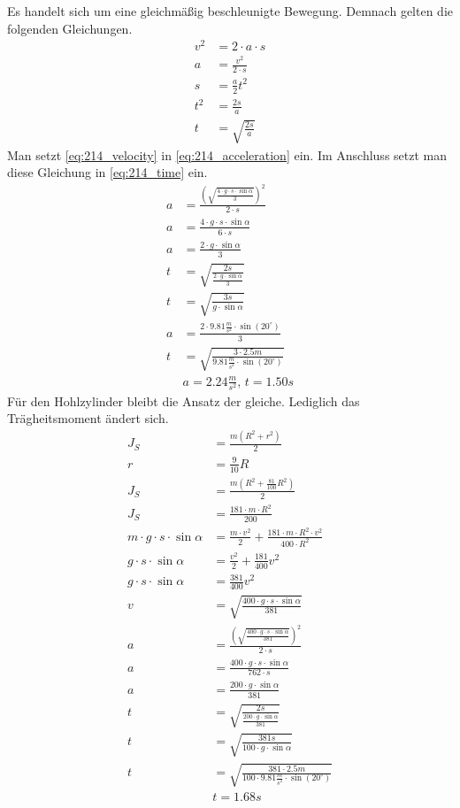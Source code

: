 \documentclass{article}
\begin{document}
	Es handelt sich um eine gleichmäßig beschleunigte Bewegung. Demnach gelten die folgenden Gleichungen.
	\begin{align}
		v^2&=2\cdot a\cdot s	\nonumber\\
		a&=\frac{v^2}{2\cdot s}	\label{eq:214_acceleration}\\
		s&=\frac{a}{2}t^2		\nonumber\\
		t^2&=\frac{2s}{a}		\nonumber\\
		t&=\sqrt{\frac{2s}{a}}	\label{eq:214_time}
	\end{align}
	Man setzt \eqref{eq:214_velocity} in \eqref{eq:214_acceleration} ein. Im Anschluss setzt man diese Gleichung in \eqref{eq:214_time} ein.
	\begin{align*}
		a&=\frac{\left(\sqrt{\frac{4\cdot g\cdot s\cdot\sin\alpha}{3}}\right)^2}{2\cdot s}\\
		a&=\frac{4\cdot g\cdot s\cdot\sin\alpha}{6\cdot s}\\
		a&=\frac{2\cdot g\cdot\sin\alpha}{3}\\
		t&=\sqrt{\frac{2s}{\frac{2\cdot g\cdot\sin\alpha}{3}}}\\
		t&=\sqrt{\frac{3s}{g\cdot\sin\alpha}}\\
		a&=\frac{2\cdot 9.81\frac{m}{s^2}\cdot\sin(20^\circ)}{3}\\
		t&=\sqrt{\frac{3\cdot2.5m}{9.81\frac{m}{s^2}\cdot\sin(20^\circ)}}\\
		&\boxed{a=2.24\frac{m}{s^2},\,t=1.50s}	\tag{b}	\label{eq:214_b}
	\end{align*}
	Für den Hohlzylinder bleibt die Ansatz der gleiche. Lediglich das Trägheitsmoment ändert sich.
	\begin{align*}
		J_S&=\frac{m(R^2+r^2)}{2}\\
		r&=\frac{9}{10}R\\
		J_S&=\frac{m(R^2+\frac{81}{100}R^2)}{2}\\
		J_S&=\frac{181\cdot m\cdot R^2}{200}\\
		m\cdot g\cdot s\cdot\sin\alpha&=\frac{m\cdot v^2}{2}+\frac{181\cdot m\cdot R^2\cdot v^2}{400\cdot R^2}\\
		g\cdot s\cdot\sin\alpha&=\frac{v^2}{2}+\frac{181}{400}v^2\\
		g\cdot s\cdot\sin\alpha&=\frac{381}{400}v^2\\
		v&=\sqrt{\frac{400\cdot g\cdot s\cdot\sin\alpha}{381}}\\
		a&=\frac{\left(\sqrt{\frac{400\cdot g\cdot s\cdot\sin\alpha}{381}}\right)^2}{2\cdot s}\\
		a&=\frac{400\cdot g\cdot s\cdot\sin\alpha}{762\cdot s}\\
		a&=\frac{200\cdot g\cdot\sin\alpha}{381}\\
		t&=\sqrt{\frac{2s}{\frac{200\cdot g\cdot\sin\alpha}{381}}}\\
		t&=\sqrt{\frac{381s}{100\cdot g\cdot\sin\alpha}}\\
		t&=\sqrt{\frac{381\cdot2.5m}{100\cdot9.81\frac{m}{s^2}\cdot\sin(20^\circ)}}\\
		&\boxed{t=1.68s}	\tag{c}	\label{eq:214_c}
	\end{align*}
	\newpage
	
\end{document}
